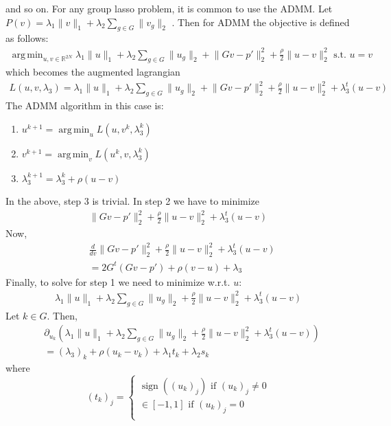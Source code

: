 \documentclass[12pt, leqno]{article}
\providecommand{\norm}[1]{\lVert#1\rVert} %
\DeclareMathOperator*{\argmin}{arg\,min}
\DeclareMathOperator*{\sign}{sign}
\begin{document}
and so on.
For any group lasso problem, it is common to use the ADMM. Let $P(v) = \lambda_1 \norm{v}_1 + \lambda_2 \sum_{g \in G} \norm{v_g}_2$ . Then for ADMM the objective is defined as follows:
\begin{align*}
\argmin_{u, v \in \mathbb{R}^{2N}} \lambda_1 \norm{u}_1 + \lambda_2 \sum_{g \in G} \norm{u_g}_2 + \norm{Gv - p'}_2^2 + \frac{\rho}{2} \norm{u-v}_2^2 \text{ s.t. } u = v
\end{align*}
which becomes the augmented lagrangian
\begin{align*}
L(u,v,\lambda_3) = \lambda_1 \norm{u}_1 + \lambda_2 \sum_{g \in G} \norm{u_g}_2 + \norm{Gv - p'}_2^2 + \frac{\rho}{2} \norm{u-v}_2^2 + \lambda_3^t(u-v)
\end{align*}
The ADMM algorithm in this case is:
\begin{enumerate}
\item $u^{k+1} = \argmin_{u} L(u,v^{k},\lambda_3^{k})$
\item $v^{k+1} = \argmin_{v} L(u^{k},v,\lambda_3^{k})$
\item $\lambda_3^{k+1} = \lambda_3^{k} + \rho(u-v)$
\end{enumerate}
In the above, step 3 is trivial. In step 2 we have to minimize 
\begin{align*}
\norm{Gv - p'}_2^2 + \frac{\rho}{2} \norm{u-v}_2^2 + \lambda_3^t(u-v)
\end{align*}
Now,
\begin{align*}
&\frac{d}{dv} \norm{Gv - p'}_2^2 + \frac{\rho}{2} \norm{u-v}_2^2 + \lambda_3^t(u-v) \\ 
&= 2G^t(Gv - p') + \rho(v-u) + \lambda_3
\end{align*}
Finally, to solve for step 1 we need to minimize w.r.t. $u$:
\begin{align*}
\lambda_1 \norm{u}_1 + \lambda_2 \sum_{g \in G} \norm{u_g}_2 + \frac{\rho}{2} \norm{u-v}_2^2 + \lambda_3^t(u-v)
\end{align*}
Let $k \in G$. Then, 
\begin{align*}
&\partial_{u_k} (\lambda_1 \norm{u}_1 + \lambda_2 \sum_{g \in G} \norm{u_g}_2 + \frac{\rho}{2} \norm{u-v}_2^2 + \lambda_3^t(u-v)) \\
&= (\lambda_3)_k + \rho (u_k-v_k) + \lambda_1 t_k + \lambda_2 s_k
\end{align*}
where 
$$
(t_k)_j = \begin{cases} \sign((u_k)_j) \text{ if } (u_k)_j \neq 0 \\
\in [-1,1]  \text{ if } (u_k)_j = 0 \\
\end{cases}
$$
\end{document}
